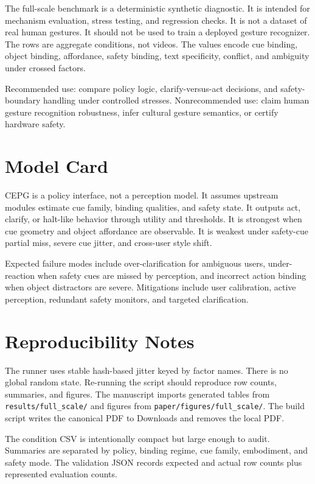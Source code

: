 \documentclass{article}
\newcommand{\method}{CEPG}
\begin{document}
The full-scale benchmark is a deterministic synthetic diagnostic. It is intended for mechanism evaluation, stress testing, and regression checks. It is not a dataset of real human gestures. It should not be used to train a deployed gesture recognizer. The rows are aggregate conditions, not videos. The values encode cue binding, object binding, affordance, safety binding, text specificity, conflict, and ambiguity under crossed factors.

Recommended use: compare policy logic, clarify-versus-act decisions, and safety-boundary handling under controlled stresses. Nonrecommended use: claim human gesture recognition robustness, infer cultural gesture semantics, or certify hardware safety.

\section{Model Card}

\method{} is a policy interface, not a perception model. It assumes upstream modules estimate cue family, binding qualities, and safety state. It outputs act, clarify, or halt-like behavior through utility and thresholds. It is strongest when cue geometry and object affordance are observable. It is weakest under safety-cue partial miss, severe cue jitter, and cross-user style shift.

Expected failure modes include over-clarification for ambiguous users, under-reaction when safety cues are missed by perception, and incorrect action binding when object distractors are severe. Mitigations include user calibration, active perception, redundant safety monitors, and targeted clarification.

\section{Reproducibility Notes}

The runner uses stable hash-based jitter keyed by factor names. There is no global random state. Re-running the script should reproduce row counts, summaries, and figures. The manuscript imports generated tables from \texttt{results/full\_scale/} and figures from \texttt{paper/figures/full\_scale/}. The build script writes the canonical PDF to Downloads and removes the local PDF.

The condition CSV is intentionally compact but large enough to audit. Summaries are separated by policy, binding regime, cue family, embodiment, and safety mode. The validation JSON records expected and actual row counts plus represented evaluation counts.
\end{document}
